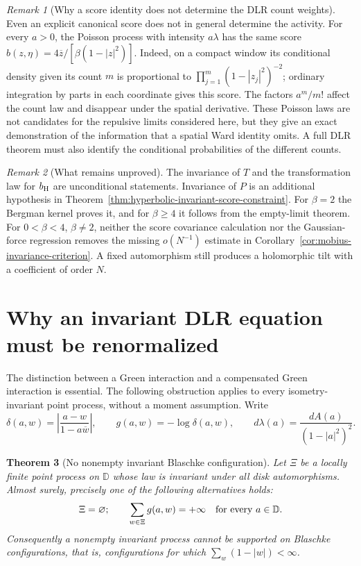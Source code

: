 \documentclass[11pt,a4paper]{article}
\numberwithin{equation}{section}
\newtheorem{theorem}{Theorem}[section]
\theoremstyle{definition}
\theoremstyle{remark}
\newtheorem{remark}[theorem]{Remark}
\begin{document}
\begin{remark}[Why a score identity does not determine the DLR count weights]
Even an explicit canonical score does not in general determine the
activity. For every $a>0$, the Poisson process with intensity
$a\lambda$ has the same score
$b(z,\eta)=4\overline z/[\beta(1-|z|^2)]$.
Indeed, on a compact window its conditional density given its count
$m$ is proportional to $\prod_{j=1}^m(1-|z_j|^2)^{-2}$; ordinary
integration by parts in each coordinate gives this score. The factors
$a^m/m!$ affect the count law and disappear under the spatial
derivative. These Poisson laws are not candidates for the repulsive
limits considered here, but they give an exact demonstration of the
information that a spatial Ward identity omits. A full DLR theorem must
also identify the conditional probabilities of the different counts.
\end{remark}

\begin{remark}[What remains unproved]
The invariance of $T$ and the transformation law for $b_{\rm H}$ are
unconditional statements. Invariance of $P$ is an additional hypothesis
in Theorem~\ref{thm:hyperbolic-invariant-score-constraint}.
For $\beta=2$ the Bergman kernel proves it, and for $\beta\ge4$ it follows
from the empty-limit theorem. For $0<\beta<4$, $\beta\ne2$, neither the
score covariance calculation nor the Gaussian-force regression removes
the missing $o(N^{-1})$ estimate in
Corollary~\ref{cor:mobius-invariance-criterion}. A fixed automorphism
still produces a holomorphic tilt with a coefficient of order $N$.
\end{remark}

\section{Why an invariant DLR equation must be renormalized}
\label{sec:invariant-dlr-obstruction}

The distinction between a Green interaction and a compensated Green
interaction is essential.  The following obstruction applies to every
isometry-invariant point process, without a moment assumption.
Write
\[
 \delta(a,w)=\left|\frac{a-w}{1-a\overline w}\right|,
 \qquad g(a,w)=-\log\delta(a,w),
 \qquad d\lambda(a)=\frac{dA(a)}{(1-|a|^2)^2}.
\]

\begin{theorem}[No nonempty invariant Blaschke configuration]
\label{thm:invariant-green-divergence}
Let $\Xi$ be a locally finite point process on $\mathbb D$ whose law is
invariant under all disk automorphisms. Almost surely, precisely one of
the following alternatives holds:
\[
 \Xi=\varnothing;
 \qquad
 \sum_{w\in\Xi}g(a,w)=+\infty
       \quad\hbox{for every }a\in\mathbb D.
\]
Consequently a nonempty invariant process cannot be supported on
Blaschke configurations, that is, configurations for which
$\sum_w(1-|w|)<\infty$.
\end{theorem}
\end{document}
